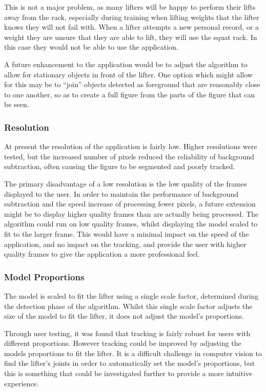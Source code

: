 This is not a major problem, as many lifters will be happy to perform their lifts away from the rack, especially during training when lifting weights that the lifter knows they will not fail with. When a lifter attempts a new personal record, or a weight they are unsure that they are able to lift, they will use the squat rack. In this case they would not be able to use the application.

A future enhancement to the application would be to adjust the algorithm to allow for stationary objects in front of the lifter. One option which might allow for this may be to ``join'' objects detected as foreground that are reasonably close to one another, so as to create a full figure from the parts of the figure that can be seen.

\subsubsection{Resolution}

At present the resolution of the application is fairly low. Higher resolutions were tested, but the increased number of pixels reduced the reliability of background subtraction, often causing the figure to be segmented and poorly tracked.

The primary disadvantage of a low resolution is the low quality of the frames displayed to the user. In order to maintain the performance of background subtraction and the speed increase of processing fewer pixels, a future extension might be to display higher quality frames than are actually being processed. The algorithm could run on low quality frames, whilst displaying the model scaled to fit to the larger frame. This would have a minimal impact on the speed of the application, and no impact on the tracking, and provide the user with higher quality frames to give the application a more professional feel.

\subsubsection{Model Proportions}

The model is scaled to fit the lifter using a single scale factor, determined during the detection phase of the algorithm. Whilst this single scale factor adjusts the size of the model to fit the lifter, it does not adjust the model's proportions.

Through user testing, it was found that tracking is fairly robust for users with different proportions. However tracking could be improved by adjusting the models proportions to fit the lifter. It is a difficult challenge in computer vision to find the lifter's joints in order to automatically set the model's proportions, but this is something that could be investigated further to provide a more intuitive experience.

